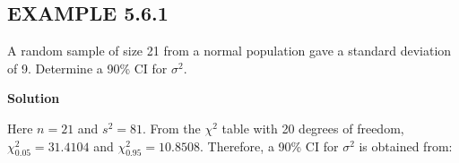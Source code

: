 \subsection*{EXAMPLE 5.6.1}
A random sample of size 21 from a normal population gave a standard deviation of 9. Determine a 90\% CI for $\sigma^2$.

\textbf{Solution}

Here $n = 21$ and $s^2 = 81$. From the $\chi^2$ table with 20 degrees of freedom, $\chi^2_{0.05} = 31.4104$ and $\chi^2_{0.95} = 10.8508$. Therefore, a 90\% CI for $\sigma^2$ is obtained from:
